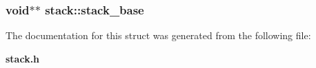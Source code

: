 \subsubsection{\setlength{\rightskip}{0pt plus 5cm}void$\ast$$\ast$ \bf{stack::stack\_\-base}}\label{structstack_de4f41e9ebe6bd0ea499cc11a2709411}




The documentation for this struct was generated from the following file:\begin{CompactItemize}
\item 
\bf{stack.h}\end{CompactItemize}
